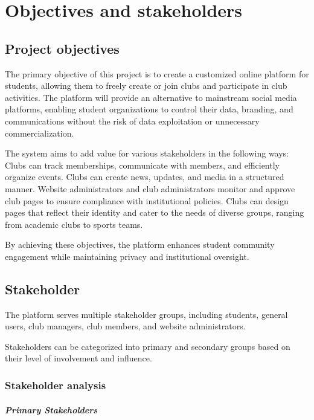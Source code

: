 \chapter{Objectives and stakeholders}

\section{Project objectives}
The primary objective of this project is to create a customized online
platform for students, allowing them to freely create or join clubs and
participate in club activities. The platform will provide an alternative
to mainstream social media platforms, enabling student organizations to
control their data, branding, and communications without the risk of
data exploitation or unnecessary commercialization.

The system aims to add value for various stakeholders in the following
ways: Clubs can track memberships, communicate with members, and
efficiently organize events. Clubs can create news, updates, and media
in a structured manner. Website administrators and club administrators
monitor and approve club pages to ensure compliance with institutional
policies. Clubs can design pages that reflect their identity and cater
to the needs of diverse groups, ranging from academic clubs to sports
teams.

By achieving these objectives, the platform enhances student community
engagement while maintaining privacy and institutional oversight.
\label{sect:objectives}

\section{Stakeholder}
The platform serves multiple stakeholder groups, including students,
general users, club managers, club members, and website administrators.

Stakeholders can be categorized into primary and secondary groups based
on their level of involvement and influence.
\label{sect:stakeholder}

\subsection{Stakeholder analysis}
\paragraph{Primary Stakeholders}\label{primary-stakeholders}


